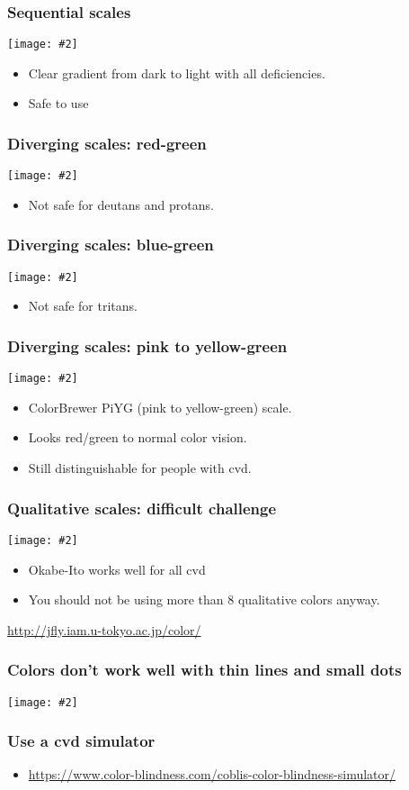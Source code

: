 \documentclass{beamer}
\newcommand{\bi}{\begin{itemize}}
\newcommand{\li}{\item}
\newcommand{\ei}{\end{itemize}}
\newcommand{\fig}[2]{\centerline{\texttt{[image: \#2]}}}
\newcommand{\bfr}[1]{\begin{frame}[fragile]\frametitle{{ #1 }}}
\begin{document}
\bfr{Sequential scales}
\fig{1}{heat-cvd-sim-1.png}
\bi
\li Clear gradient from dark to light with all deficiencies.
\li Safe to use
\ei
\end{frame}

\bfr{Diverging scales: red-green}
\fig{1}{red-green-cvd-sim-1.png}
\bi
\li Not safe for deutans and protans.
\ei
\end{frame}

\bfr{Diverging scales: blue-green}
\fig{1}{blue-green-cvd-sim-1.png}
\bi
\li Not safe for tritans.
\ei
\end{frame}

\bfr{Diverging scales: pink to yellow-green}
\fig{1}{PiYG-cvd-sim-1.png}
\bi
\li ColorBrewer PiYG (pink to yellow-green) scale.
\li Looks red/green to normal color vision.
\li Still distinguishable for people with cvd.
\ei
\end{frame}

\bfr{Qualitative scales: difficult challenge}

\fig{1}{palette-Okabe-Ito-1.png}
\bi
\li Okabe-Ito works well for all cvd
\li You should not be using more than 8 qualitative colors anyway.
\ei

\vfill
\url{http://jfly.iam.u-tokyo.ac.jp/color/}

\end{frame}

\bfr{Colors don't work well with thin lines and small dots}
\fig{1}{colors-thin-lines-1.png}
\end{frame}

\bfr{Use a cvd simulator}
\bi
\li \url{https://www.color-blindness.com/coblis-color-blindness-simulator/}
\ei
\end{frame}
\end{document}

